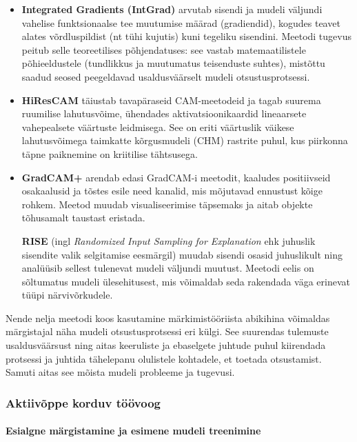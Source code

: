     \begin{itemize}
    \item \textbf{Integrated Gradients (IntGrad)} \parencite{sundararajan_axiomatic_2017} arvutab sisendi ja mudeli väljundi vahelise funktsionaalse tee muutumise määrad (gradiendid), kogudes teavet alates võrdluspildist (nt tühi kujutis) kuni tegeliku sisendini. Meetodi tugevus peitub selle teoreetilises põhjendatuses: see vastab matemaatilistele põhieeldustele (tundlikkus ja muutumatus teisenduste suhtes), mistõttu saadud seosed peegeldavad usaldusväärselt mudeli otsustusprotsessi.

    \item \textbf{HiResCAM} \parencite{draelos_use_2020} täiustab tavapäraseid CAM-meetodeid ja tagab suurema ruumilise lahutusvõime, ühendades aktivatsioonikaardid lineaarsete vahepealsete väärtuste leidmisega. See on eriti väärtuslik väikese lahutusvõimega taimkatte kõrgusmudeli (CHM) rastrite puhul, kus piirkonna täpne paiknemine on kriitilise tähtsusega.

    \item \textbf{GradCAM+} \parencite{chattopadhay_grad-cam_2018} arendab edasi GradCAM-i meetodit, kaaludes positiivseid osakaalusid ja tõstes esile need kanalid, mis mõjutavad ennustust kõige rohkem. Meetod muudab visualiseerimise täpsemaks ja aitab objekte tõhusamalt taustast eristada.

    \textbf{RISE} (ingl \textit{Randomized Input Sampling for Explanation} ehk juhuslik sisendite valik selgitamise eesmärgil) \parencite{petsiuk_rise_2018} muudab sisendi osasid juhuslikult ning analüüsib sellest tulenevat mudeli väljundi muutust. Meetodi eelis on sõltumatus mudeli ülesehitusest, mis võimaldab seda rakendada väga erinevat tüüpi närvivõrkudele.
    \end{itemize}

    Nende nelja meetodi koos kasutamine märkimistööriista abikihina võimaldas märgistajal näha mudeli otsustusprotsessi eri külgi. See suurendas tulemuste usaldusväärsust ning aitas keeruliste ja ebaselgete juhtude puhul kiirendada protsessi ja juhtida tähelepanu olulistele kohtadele, et toetada otsustamist. Samuti aitas see mõista mudeli probleeme ja tugevusi.

    \subsubsection{Aktiivõppe korduv töövoog}

    \paragraph{Esialgne märgistamine ja esimene mudeli treenimine}

